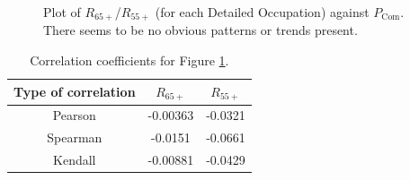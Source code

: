 \documentclass[11pt]{article}
\begin{document}
\begin{figure}[!htb]
	\centering
	\hfill
	\hfill
	\caption{Plot of $R_{65+}$/$R_{55+}$ (for each Detailed Occupation) against $P_{\text{Com}}$. There seems to be no obvious patterns or trends present.}
	\label{fig:EP/OP against PCom}
\end{figure}



\begin{table}[]
\centering
\begin{tabular}{@{}ccc@{}}
\toprule
\textbf{Type of correlation} & \textbf{$R_{65+}$} & \textbf{$R_{55+}$} \\ \midrule
Pearson                      & -0.00363    & -0.0321     \\
Spearman                     & -0.0151     & -0.0661     \\
Kendall                      & -0.00881    & -0.0429    \\ \bottomrule
\end{tabular}
\caption{Correlation coefficients for Figure \ref{fig:EP/OP against PCom}.}
\label{tab:correlation}
\end{table}
\end{document}
